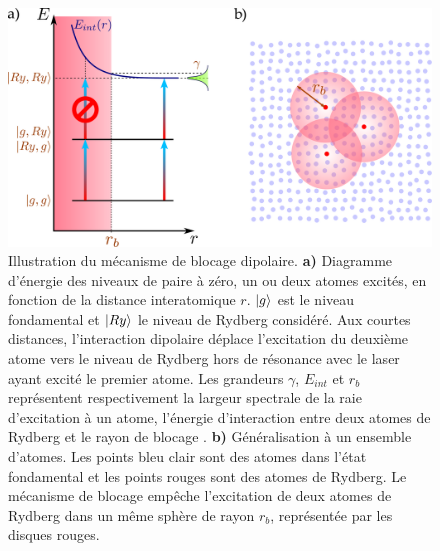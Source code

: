 \begin{figure}[!h]
\centering
\includegraphics[height=.3\textheight]{figures/low_l/dip_block}
\caption[Mécanisme du blocage dipolaire]{
Illustration du mécanisme de blocage dipolaire.
\textbf{a)} Diagramme d'énergie des niveaux de paire à zéro, un ou deux atomes excités, en fonction de la distance interatomique $r$.
$\ket{g}$ est le niveau fondamental et $\ket{Ry}$ le niveau de Rydberg considéré.
Aux courtes distances, l'interaction dipolaire déplace l'excitation du deuxième atome vers le niveau de Rydberg hors de résonance avec le laser ayant excité le premier atome.
Les grandeurs $\gamma$, $E_{int}$ et $r_b$ représentent respectivement la largeur spectrale de la raie d'excitation à un atome, l'énergie d'interaction entre deux atomes de Rydberg et le \og rayon de blocage \fg{}.
\textbf{b)} Généralisation à un ensemble d'atomes. Les points bleu clair sont des atomes dans l'état fondamental et les points rouges sont des atomes de Rydberg.
Le mécanisme de blocage empêche l'excitation de deux atomes de Rydberg dans un même sphère de rayon $r_b$, représentée par les disques rouges.
}
\label{fig:dip_block}
\end{figure}

